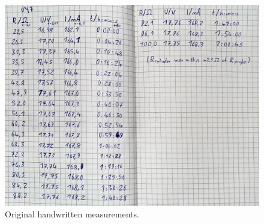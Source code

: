 \begin{figure}[H]
	\centering
	\includegraphics[width=0.8\linewidth]{content/measurement/original.jpg}
	\caption{Original handwritten measurements.}
	\label{fig:original}
\end{figure}

\vfill\null
